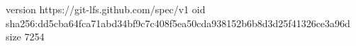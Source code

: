 version https://git-lfs.github.com/spec/v1
oid sha256:dd5cba64fca71abd34bf9c7c408f5ea50cda938152b6b8d3d25f41326ce3a96d
size 7254
